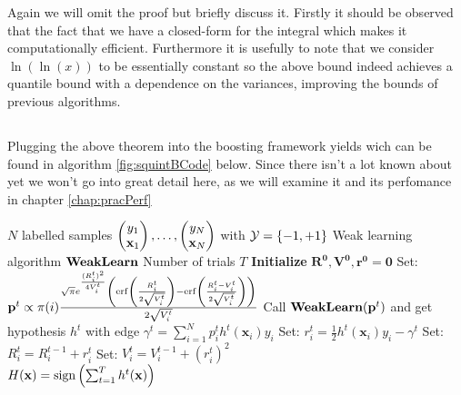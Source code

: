  Again we will omit the proof but briefly discuss it. Firstly it should be observed that the fact that we have a closed-form for the integral which makes it computationally efficient. Furthermore it is usefully to note that we consider $\ln(\ln(x))$ to be essentially constant so the above bound indeed achieves a quantile bound with a dependence on the variances, improving the bounds of previous algorithms.

\subsection{\squintB}
\label{subsec:algoSquintB}
Plugging the above theorem into the boosting framework yields \squintB wich can be found in algorithm \ref{fig:squintBCode} below. Since there isn't a lot known about \squintB yet we won't go into great detail here, as we will examine it and its perfomance in chapter \ref{chap:pracPerf}
\begin{algorithm} 
\caption{\NHB}
\label{fig:squintBCode}
\begin{algorithmic}[1]
\Require 
\Statex $N$ labelled samples $\Vec{y_1\\ \mathbf x_1},\ldots,\Vec{y_N\\ \mathbf x_N}$  with $\mathcal Y = \set{-1,+1}$ 
\Statex Weak learning algorithm $\weak$
\Statex Number of trials $T$
\Procedure{\squintB}{}
\State \textbf{Initialize} $\mathbf{R^0,V^0,r^0} = \mathbf 0$
\State Set: $\mathbf p^t \propto \pi(i) \frac{\sqrt{\pi}e^{\frac{(R^t_i)^2}{4V^t_i}}\lubke{\erf\lubke{\frac{R^t_i}{2\sqrt{V_i^t}}}-\erf\lubke{\frac{R_i^t-V_i^t}{2\sqrt{V_i^t}}}}}{2\sqrt{V_i^t}} $ 
\State Call $\weak(\mathbf p^t)$ and get hypothesis $h^t$ with edge $\gamma^t = \sum_{i=1}^N p^t_ih^t(\mathbf x_i)y_i$
\State Set: $r_i^t=\frac12h^t(\mathbf x_i)y_i-\gamma^t$ 
\State Set: $R_i^t = R_i^{t-1} + r_i^t $ 
\State Set: $V_i^t = V_i^{t-1} + (r_i^t)^2$
\EndFor\\
\Return $H(\mathbf x) = \sign\lubke{\sum^T_{t=1}h^t(\mathbf{x})}$
\EndProcedure
\end{algorithmic}
\end{algorithm}
